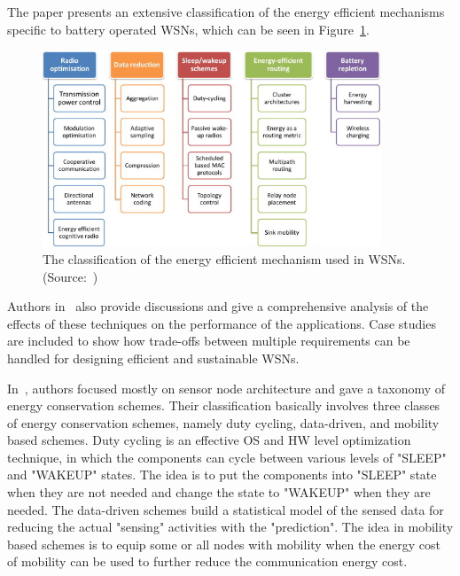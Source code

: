\documentclass[12pt, oneandhalf, chaparabic, sees, ms]{metu}
\begin{document}
The paper presents an extensive classification of the energy efficient mechanisms specific to battery operated WSNs, which can be seen in Figure~\ref{fig:energy-opt-techs}.

% 
%
%
\begin{figure}[!htbp]
 \begin{center}
  \includegraphics[width=0.90\textwidth]{energy-opt-techs.png}
 \end{center}
 \caption{The classification of the energy efficient mechanism used in WSNs. (Source:~\protect\cite{rault2014})}
  \label{fig:energy-opt-techs}
\end{figure}
% 
%
%
Authors in~\cite{rault2014} also provide discussions and give a comprehensive analysis of the effects of these techniques on the performance of the applications.
Case studies are included to show how trade-offs between multiple requirements can be handled for designing efficient and sustainable WSNs.

In~\cite{anastasi2009}, authors focused mostly on sensor node architecture and gave a taxonomy of energy conservation schemes. Their classification basically involves three classes of
energy conservation schemes, namely duty cycling, data-driven, and mobility based schemes. Duty cycling is an effective OS and HW level optimization technique, in which the components
can cycle between various levels of "SLEEP" and "WAKEUP" states. The idea is to put the components into "SLEEP" state when they are not needed and change the state to "WAKEUP" when
they are needed. The data-driven schemes build a statistical model of the sensed data for reducing the actual "sensing" activities with the "prediction". The idea in mobility based schemes
is to equip some or all nodes with mobility when the energy cost of mobility can be used to further reduce the communication energy cost.
\end{document}
